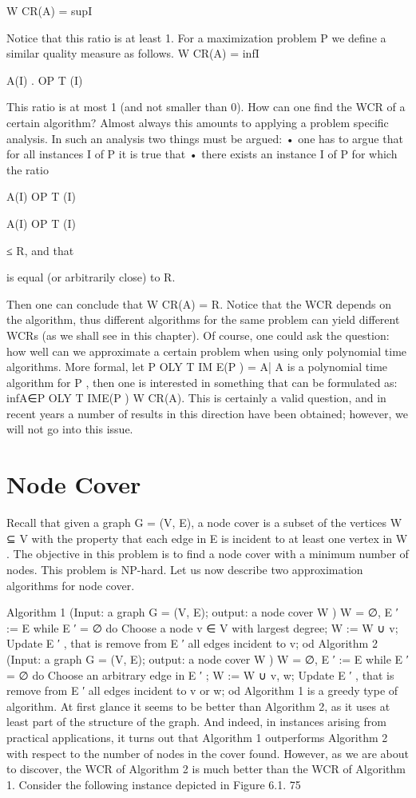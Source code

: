 W CR(A) = supI

Notice that this ratio is at least 1. For a maximization problem P we define a similar quality measure as
follows.
W CR(A) = infI

A(I)
.
OP T (I)

This ratio is at most 1 (and not smaller than 0). How can one find the WCR of a certain algorithm?
Almost always this amounts to applying a problem specific analysis. In such an analysis two things must
be argued:
• one has to argue that for all instances I of P it is true that
• there exists an instance I of P for which the ratio

A(I)
OP T (I)

A(I)
OP T (I)

≤ R, and that

is equal (or arbitrarily close) to R.

Then one can conclude that W CR(A) = R. Notice that the WCR depends on the algorithm, thus different
algorithms for the same problem can yield different WCRs (as we shall see in this chapter). Of course, one
could ask the question: how well can we approximate a certain problem when using only polynomial time
algorithms. More formal, let P OLY T IM E(P ) = {A| A is a polynomial time algorithm for P }, then one
is interested in something that can be formulated as:
infA∈P OLY T IME(P ) W CR(A).
This is certainly a valid question, and in recent years a number of results in this direction have been
obtained; however, we will not go into this issue.

\section{Node Cover}

Recall that given a graph G = (V, E), a node cover is a subset of the vertices W ⊆ V with the property
that each edge in E is incident to at least one vertex in W . The objective in this problem is to find
a node cover with a minimum number of nodes. This problem is NP-hard. Let us now describe two
approximation algorithms for node cover.

Algorithm 1 (Input: a graph G = (V, E); output: a node cover W )
W = ∅, E ′ := E
while E ′ = ∅
do
Choose a node v ∈ V with largest degree;
W := W ∪ {v};
Update E ′ , that is remove from E ′ all edges incident to v;
od
Algorithm 2 (Input: a graph G = (V, E); output: a node cover W )
W = ∅, E ′ := E
while E ′ = ∅
do
Choose an arbitrary edge in E ′ ;
W := W ∪ {v, w};
Update E ′ , that is remove from E ′ all edges incident to v or w;
od
Algorithm 1 is a greedy type of algorithm. At first glance it seems to be better than Algorithm 2, as it uses
at least part of the structure of the graph. And indeed, in instances arising from practical applications,
it turns out that Algorithm 1 outperforms Algorithm 2 with respect to the number of nodes in the cover
found. However, as we are about to discover, the WCR of Algorithm 2 is much better than the WCR of
Algorithm 1.
Consider the following instance depicted in Figure 6.1.
75

